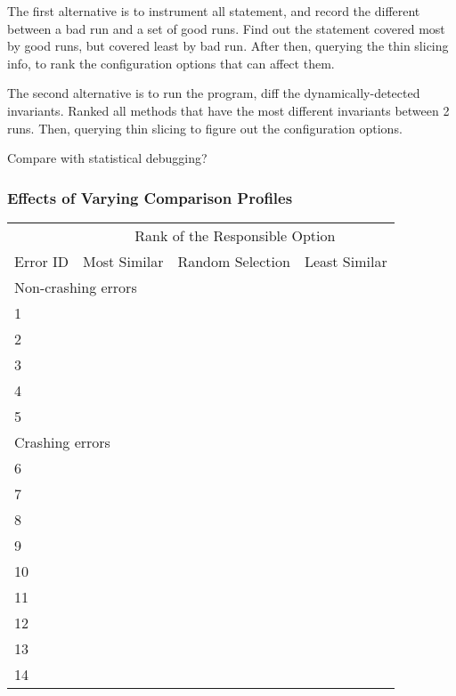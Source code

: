 The first alternative is to instrument all statement, and record the different between a bad run and
a set of good runs. Find out the statement covered most by good runs, but covered least by bad run.
After then, querying the thin slicing info, to rank the configuration options that can affect them.


The second alternative is to run the program, diff the dynamically-detected invariants. Ranked all
methods that have the most different invariants between 2 runs. Then, querying thin slicing to
figure out the configuration options.

Compare with statistical debugging?

\subsubsection{Effects of Varying Comparison Profiles}


\begin{table}[t]
\setlength{\tabcolsep}{.54\tabcolsep}
\begin{tabular}{|l|l|l|l|}
\hline
  & \multicolumn{3}{|c|}{Rank of the Responsible Option } \\
\cline{2-4}
 Error ID & Most Similar& Random Selection& Least Similar\\
 \hline
\hline
\multicolumn{4}{|l|}{Non-crashing errors}   \\
 \hline
 1 & & &\\
 2 & & &\\
 3 & & &\\
 4 & & &\\
 5 & & &\\
\hline
\hline
\multicolumn{4}{|l|}{Crashing errors}   \\
\hline
 6 & & &\\
 7 & & &\\
 8 & & &\\
 9 & & &\\
 10 & & &\\
 11 & & &\\
 12 & & &\\
 13 & & &\\
 14 & & &\\
\hline
\end{tabular}

\end{table}


